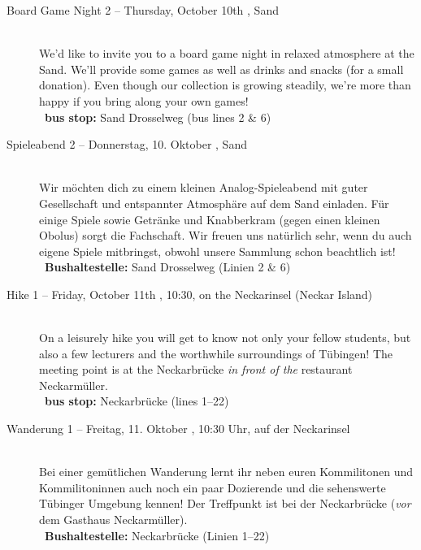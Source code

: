 \begin{description}
\ifml
    \item[Board Game Night 2 -- Thursday, October 10th \YEAR, Sand]~\\%
    We'd like to invite you to a board game night in relaxed atmosphere at the Sand.
    We'll provide some games as well as drinks and snacks (for a small donation).
    Even though our collection is growing steadily, we're more than happy if you bring along your own games!\\
    ~\textbf{bus stop:} Sand Drosselweg (bus lines 2 \& 6)
\else
    \item[Spieleabend 2 -- Donnerstag, 10. Oktober \YEAR, Sand]~\\%
    Wir möchten dich zu einem kleinen Analog-Spieleabend mit guter Gesellschaft und entspannter Atmosphäre auf dem Sand einladen.
    Für einige Spiele sowie Getränke und Knabberkram (gegen einen kleinen Obolus) sorgt die Fachschaft.
    Wir freuen uns natürlich sehr, wenn du auch eigene Spiele mitbringst, obwohl unsere Sammlung schon beachtlich ist!\\
    ~\textbf{Bushaltestelle:} Sand Drosselweg (Linien 2 \& 6)
\fi

\ifml \pagebreak \fi

\ifml
    \item[Hike 1 -- Friday, October 11th \YEAR, 10:30, on the Neckarinsel (Neckar Island)]~\\
    On a leisurely hike you will get to know not only your fellow students,
    but also a few lecturers and the worthwhile surroundings of Tübingen!
    The meeting point is at the Neckarbrücke \emph{in front of the} restaurant \glqq Neckarmüller\grqq. \\
    ~\textbf{bus stop:} Neckarbrücke (lines 1--22)
\else
    \item[Wanderung 1 -- Freitag, 11. Oktober \YEAR, 10:30 Uhr, auf der Neckarinsel]~\\
    Bei einer gemütlichen Wanderung lernt ihr neben euren Kommilitonen und Kommilitoninnen auch
    noch ein paar Dozierende und die sehenswerte Tübinger Umgebung kennen!
    Der Treffpunkt ist bei der Neckarbrücke (\emph{vor} dem Gasthaus \glqq Neckarmüller\grqq).\\
    ~\textbf{Bushaltestelle:} Neckarbrücke (Linien 1--22)
\fi


\end{description}

